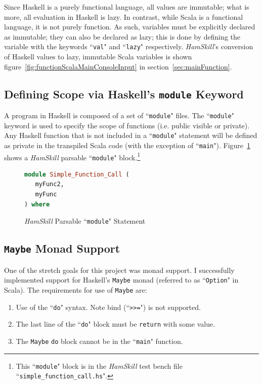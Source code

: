 \documentclass{report}
\begin{document}
Since Haskell is a purely functional language, all values are immutable; what is more, all evaluation in Haskell is lazy.  In contrast, while Scala is a functional language, it is not purely function.  As such, variables must be explicitly declared as immutable; they can also be declared as lazy; this is done by defining the variable with the keywords ``\texttt{val}" and ``\texttt{lazy}" respectively.  \textit{HamSkill}'s conversion of Haskell values to lazy, immutable Scala variables is shown figure~\ref{fig:functionScalaMainConsoleInput} in section~\ref{sec:mainFunction}.

\subsection{Defining Scope via Haskell's {\tt module} Keyword}

A program in Haskell is composed of a set of ``{\tt module}" files.  The ``{\tt module}" keyword is used to specify the scope of functions (i.e. public visible or private). Any Haskell function that is not included in a ``\texttt{module}" statement will be defined as private in the transpiled Scala code (with the exception of ``\texttt{main}").  Figure~\ref{fig:haskellModule} shows a \textit{HamSkill} parsable ``\texttt{module}" block.\footnote{This ``\texttt{module}" block is in the \textit{HamSkill} test bench file ``\texttt{simple\_function\_call.hs}".}

\begin{figure}[H]
\begin{mdframed}
\begin{lstlisting}[language=Haskell]
module Simple_Function_Call (
   myFunc2,
   myFunc
) where
\end{lstlisting}
\end{mdframed}
\caption{\textit{HamSkill} Parsable ``\texttt{module}" Statement}\label{fig:haskellModule}
\end{figure}


\subsection{\texttt{Maybe} Monad Support}

One of the stretch goals for this project was monad support.  I successfully implemented support for Haskell's \texttt{Maybe} monad (referred to as ``\texttt{Option}" in Scala).  The requirements for use of \texttt{Maybe} are:

\begin{enumerate}

\item Use of the ``\texttt{do}" syntax.  Note bind (``\texttt{>>=}") is not supported.

\item The last line of the ``\texttt{do}" block must be \texttt{return} with some value.

\item The \texttt{Maybe} \texttt{do} block cannot be in the ``\texttt{main}" function.

\end{enumerate}
\end{document}
